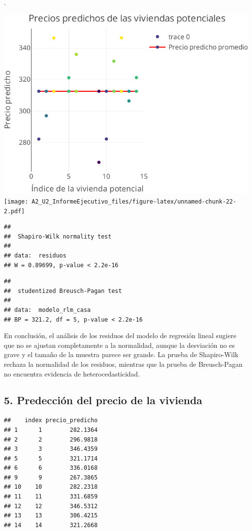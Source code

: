 \documentclass[
]{article}
\begin{document}
.

\includegraphics{A2_U2_InformeEjecutivo_files/figure-latex/unnamed-chunk-22-1.pdf}
\texttt{[image: A2\_U2\_InformeEjecutivo\_files/figure-latex/unnamed-chunk-22-2.pdf]}

\begin{verbatim}
## 
##  Shapiro-Wilk normality test
## 
## data:  residuos
## W = 0.89699, p-value < 2.2e-16
\end{verbatim}

\begin{verbatim}
## 
##  studentized Breusch-Pagan test
## 
## data:  modelo_rlm_casa
## BP = 321.2, df = 5, p-value < 2.2e-16
\end{verbatim}

En conclusión, el análisis de los residuos del modelo de regresión
lineal sugiere que no se ajustan completamente a la normalidad, aunque
la desviación no es grave y el tamaño de la muestra parece ser grande.
La prueba de Shapiro-Wilk rechaza la normalidad de los residuos,
mientras que la prueba de Breusch-Pagan no encuentra evidencia de
heterocedasticidad.

\subsection{5. Predección del precio de la
vivienda}\label{predecciuxf3n-del-precio-de-la-vivienda}

\begin{verbatim}
##    index precio_predicho
## 1      1        282.1364
## 2      2        296.9818
## 3      3        346.4359
## 5      5        321.1714
## 6      6        336.0168
## 9      9        267.3865
## 10    10        282.2318
## 11    11        331.6859
## 12    12        346.5312
## 13    13        306.4215
## 14    14        321.2668
\end{verbatim}
\end{document}
